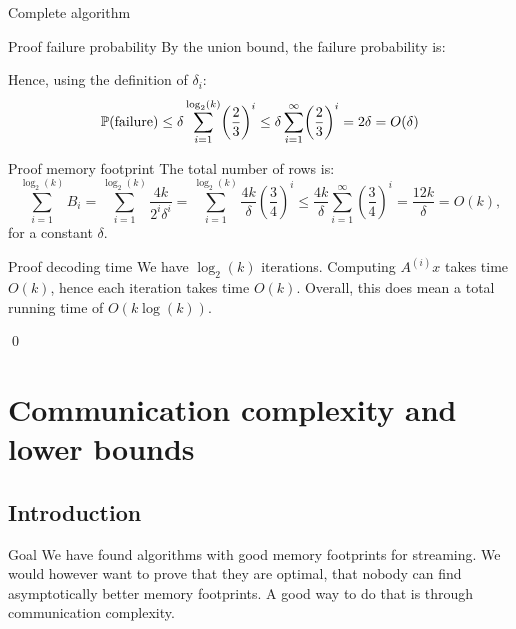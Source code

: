 \documentclass[a4paper]{article}
\begin{document}
\begin{parag}{Complete algorithm}
    \begin{subparag}{Proof failure probability}
        By the union bound, the failure probability is: 

        Hence, using the definition of $\delta_i$:
        \[\prob\left(\text{failure}\right) \leq \delta \sum_{i=1}^{\log_2\left(k\right)} \left(\frac{2}{3}\right)^i \leq \delta \sum_{i=1}^{\infty} \left(\frac{2}{3}\right)^i = 2\delta = O\left(\delta\right)\]
    \end{subparag}

    \begin{subparag}{Proof memory footprint}
        The total number of rows is: 
        \[\sum_{i=1}^{\log_2\left(k\right)} B_i = \sum_{i=1}^{\log_2\left(k\right)} \frac{4k}{2^i \delta^i} = \sum_{i=1}^{\log_2\left(k\right)} \frac{4k}{\delta} \left(\frac{3}{4}\right)^i \leq \frac{4k}{\delta} \sum_{i=1}^{\infty} \left(\frac{3}{4}\right)^i = \frac{12k}{\delta} = O\left(k\right),\]
        for a constant $\delta$.
    \end{subparag}

    \begin{subparag}{Proof decoding time}
        We have $\log_2\left(k\right)$ iterations. Computing $A^{\left(i\right)} x$ takes time $O\left(k\right)$, hence each iteration takes time $O\left(k\right)$. Overall, this does mean a total running time of $O\left(k \log\left(k\right)\right)$.

        \qed
    \end{subparag}
\end{parag}

\section{Communication complexity and lower bounds}

\subsection{Introduction}

\begin{parag}{Goal}
    We have found algorithms with good memory footprints for streaming. We would however want to prove that they are optimal, that nobody can find asymptotically better memory footprints. A good way to do that is through communication complexity.
\end{parag}
\end{document}
